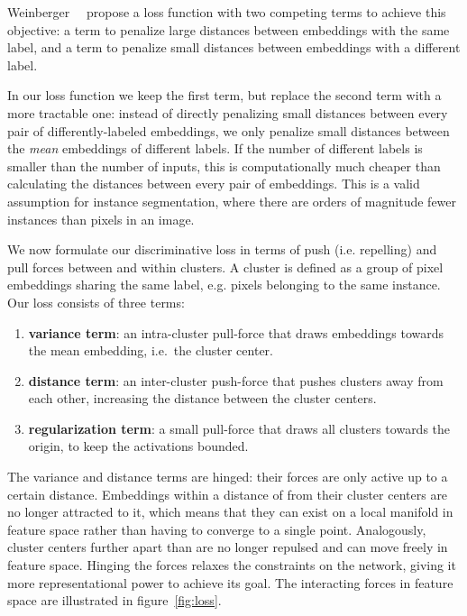 \documentclass[10pt,twocolumn,letterpaper]{article}
\begin{document}
Weinberger~\etal~\cite{weinberger2009distance} propose a loss function with two competing terms to achieve this objective: a term to penalize large distances between embeddings with the same label, and a term to penalize small distances between embeddings with a different label.

In our loss function we keep the first term, but replace the second term with a more tractable one: instead of directly penalizing small distances between every pair of differently-labeled embeddings, we only penalize small distances between the \textit{mean} embeddings of different labels. 
If the number of different labels is smaller than the number of inputs, this is computationally much cheaper than calculating the distances between every pair of embeddings. This is a valid assumption for instance segmentation, where there are orders of magnitude fewer instances than pixels in an image.

We now formulate our discriminative loss in terms of push (i.e. repelling) and pull forces between and within clusters. A cluster is defined as a group of pixel embeddings sharing the same label, e.g. pixels belonging to the same instance. 
Our loss consists of three terms:

\begin{enumerate}
	\item \textbf{variance term}: an intra-cluster pull-force that draws embeddings towards the mean embedding, i.e.~the cluster center.
	\item \textbf{distance term}: an inter-cluster push-force that pushes clusters away from each other, increasing the distance between the cluster centers.
	\item \textbf{regularization term}: a small pull-force that draws all clusters towards the origin, to keep the activations bounded.
\end{enumerate}

The variance and distance terms are hinged: their forces are only active up to a certain distance. Embeddings within a distance of  from their cluster centers are no longer attracted to it, which means that they can exist on a local manifold in feature space rather than having to converge to a single point. Analogously, cluster centers further apart than  are no longer repulsed and can move freely in feature space. Hinging the forces relaxes the constraints on the network, giving it more representational power to achieve its goal. 
The interacting forces in feature space are illustrated in figure~\ref{fig:loss}. 
\end{document}
